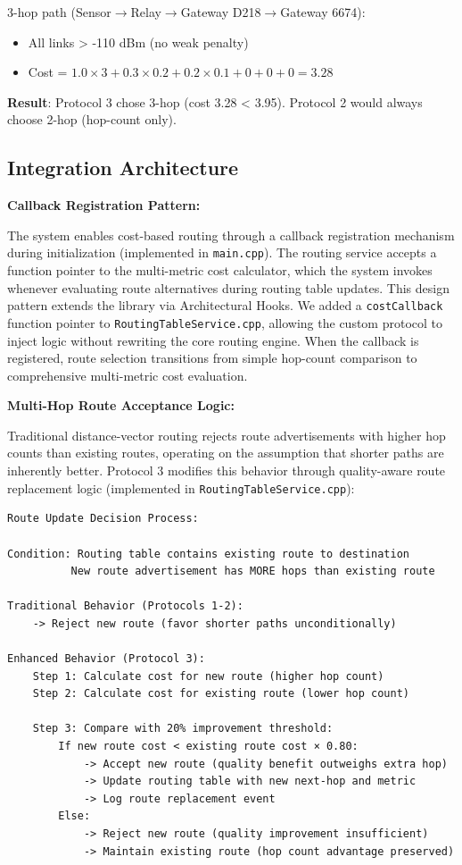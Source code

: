 3-hop path (Sensor$\rightarrow$Relay$\rightarrow$Gateway D218$\rightarrow$Gateway 6674):
\begin{itemize}
\item All links > -110 dBm (no weak penalty)
\item Cost = $1.0 \times 3 + 0.3 \times 0.2 + 0.2 \times 0.1 + 0 + 0 + 0 = 3.28$
\end{itemize}

\textbf{Result}: Protocol 3 chose 3-hop (cost 3.28 < 3.95). Protocol 2 would always choose 2-hop (hop-count only).

\subsection{Integration Architecture}

\textbf{Callback Registration Pattern:}

The system enables cost-based routing through a callback registration mechanism during initialization (implemented in \texttt{main.cpp}). The routing service accepts a function pointer to the multi-metric cost calculator, which the system invokes whenever evaluating route alternatives during routing table updates. This design pattern extends the library via Architectural Hooks. We added a \texttt{costCallback} function pointer to \texttt{RoutingTableService.cpp}, allowing the custom protocol to inject logic without rewriting the core routing engine. When the callback is registered, route selection transitions from simple hop-count comparison to comprehensive multi-metric cost evaluation.

\textbf{Multi-Hop Route Acceptance Logic:}

Traditional distance-vector routing rejects route advertisements with higher hop counts than existing routes, operating on the assumption that shorter paths are inherently better. Protocol 3 modifies this behavior through quality-aware route replacement logic (implemented in \texttt{RoutingTableService.cpp}):

\begin{verbatim}
Route Update Decision Process:

Condition: Routing table contains existing route to destination
          New route advertisement has MORE hops than existing route

Traditional Behavior (Protocols 1-2):
    -> Reject new route (favor shorter paths unconditionally)

Enhanced Behavior (Protocol 3):
    Step 1: Calculate cost for new route (higher hop count)
    Step 2: Calculate cost for existing route (lower hop count)

    Step 3: Compare with 20% improvement threshold:
        If new route cost < existing route cost × 0.80:
            -> Accept new route (quality benefit outweighs extra hop)
            -> Update routing table with new next-hop and metric
            -> Log route replacement event
        Else:
            -> Reject new route (quality improvement insufficient)
            -> Maintain existing route (hop count advantage preserved)
\end{verbatim}

